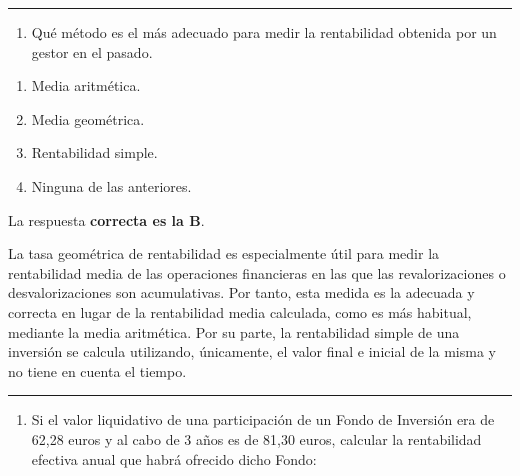 \documentclass[
  letterpaper,
  DIV=11,
  numbers=noendperiod]{scrreprt}
\providecommand{\tightlist}{%
  \setlength{\itemsep}{0pt}\setlength{\parskip}{0pt}}\usepackage{longtable,booktabs,array}
\begin{document}
\begin{center}\rule{0.5\linewidth}{0.5pt}\end{center}

\begin{enumerate}
\def\labelenumi{\arabic{enumi}.}
\setcounter{enumi}{48}
\tightlist
\item
  Qué método es el más adecuado para medir la rentabilidad obtenida por
  un gestor en el pasado.
\end{enumerate}

\begin{enumerate}
\def\labelenumi{\alph{enumi})}
\item
  Media aritmética.
\item
  Media geométrica.
\item
  Rentabilidad simple.
\item
  Ninguna de las anteriores.
\end{enumerate}

\begin{tcolorbox}[enhanced jigsaw, left=2mm, opacityback=0, colback=white, breakable, arc=.35mm, bottomrule=.15mm, rightrule=.15mm, toprule=.15mm, leftrule=.75mm, colframe=quarto-callout-tip-color-frame]
\begin{minipage}[t]{5.5mm}
\textcolor{quarto-callout-tip-color}{\faLightbulb}
\end{minipage}%
\begin{minipage}[t]{\textwidth - 5.5mm}

La respuesta \textbf{correcta es la B}.

La tasa geométrica de rentabilidad es especialmente útil para medir la
rentabilidad media de las operaciones financieras en las que las
revalorizaciones o desvalorizaciones son acumulativas. Por tanto, esta
medida es la adecuada y correcta en lugar de la rentabilidad media
calculada, como es más habitual, mediante la media aritmética. Por su
parte, la rentabilidad simple de una inversión se calcula utilizando,
únicamente, el valor final e inicial de la misma y no tiene en cuenta el
tiempo.

\end{minipage}%
\end{tcolorbox}

\begin{center}\rule{0.5\linewidth}{0.5pt}\end{center}

\begin{enumerate}
\def\labelenumi{\arabic{enumi}.}
\setcounter{enumi}{49}
\tightlist
\item
  Si el valor liquidativo de una participación de un Fondo de Inversión
  era de 62,28 euros y al cabo de 3 años es de 81,30 euros, calcular la
  rentabilidad efectiva anual que habrá ofrecido dicho Fondo:
\end{enumerate}
\end{document}

